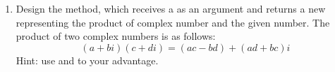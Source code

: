 \begin{enumerate}[label=(\alph*)]
    \item Design the  method, which receives a  as an argument and returns a new  representing the product of  complex number and the given number. The product of two complex numbers is as follows:
    \[
        (a + bi)(c + di) = (ac - bd) + (ad + bc)i    
    \]
    Hint: use  and  to your advantage.
\end{enumerate}